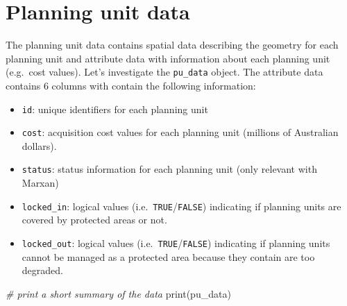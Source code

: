 \documentclass[
  12pt,
]{book}
\newenvironment{Shaded}{\begin{snugshade}}{\end{snugshade}}
\newcommand{\CommentTok}[1]{\textcolor[rgb]{0.56,0.35,0.01}{\textit{#1}}}
\newcommand{\FunctionTok}[1]{\textcolor[rgb]{0.00,0.00,0.00}{#1}}
\newcommand{\NormalTok}[1]{#1}
\newcommand{\OtherTok}[1]{\textcolor[rgb]{0.56,0.35,0.01}{#1}}
\newcommand{\SpecialCharTok}[1]{\textcolor[rgb]{0.00,0.00,0.00}{#1}}
\newcommand{\StringTok}[1]{\textcolor[rgb]{0.31,0.60,0.02}{#1}}
\providecommand{\tightlist}{%
  \setlength{\itemsep}{0pt}\setlength{\parskip}{0pt}}
\begin{document}
\begin{Shaded}
\end{Shaded}

\clearpage

\hypertarget{planning-unit-data}{%
\section{Planning unit data}\label{planning-unit-data}}

The planning unit data contains spatial data describing the geometry for each planning unit and attribute data with information about each planning unit (e.g.~cost values). Let's investigate the \texttt{pu\_data} object. The attribute data contains 6 columns with contain the following information:

\begin{itemize}
\tightlist
\item
  \texttt{id}: unique identifiers for each planning unit
\item
  \texttt{cost}: acquisition cost values for each planning unit (millions of Australian dollars).
\item
  \texttt{status}: status information for each planning unit (only relevant with Marxan)
\item
  \texttt{locked\_in}: logical values (i.e.~\texttt{TRUE}/\texttt{FALSE}) indicating if planning units are covered by protected areas or not.
\item
  \texttt{locked\_out}: logical values (i.e.~\texttt{TRUE}/\texttt{FALSE}) indicating if planning units cannot be managed as a protected area because they contain are too degraded.
\end{itemize}

\begin{Shaded}
\begin{Highlighting}[]
\CommentTok{\# print a short summary of the data}
\FunctionTok{print}\NormalTok{(pu\_data)}
\end{Highlighting}
\end{Shaded}
\end{document}
